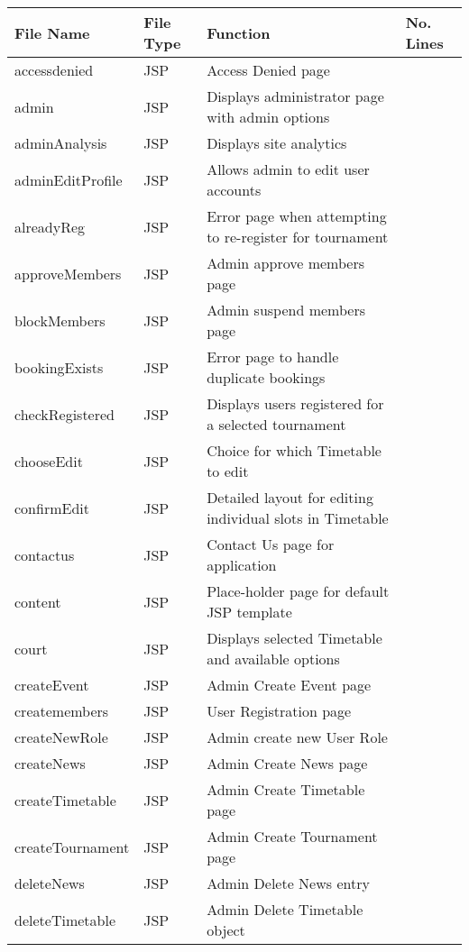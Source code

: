 \begin{table}[H]
\begin{center}
     \begin{tabular}{| l | l | l| p{1cm} |}
    \hline
    File Name & File Type & Function & No. Lines\\ \hline
	accessdenied & JSP & Access Denied page\\ \hline	
	admin & JSP & Displays administrator page with admin options\\ \hline	
	adminAnalysis & JSP & Displays site analytics\\ \hline	
	adminEditProfile & JSP & Allows admin to edit user accounts\\ \hline	
	alreadyReg & JSP & Error page when attempting to re-register for tournament \\ \hline	
	approveMembers & JSP & Admin approve members page\\ \hline	
	blockMembers & JSP & Admin suspend members page\\ \hline	
	bookingExists & JSP & Error page to handle duplicate bookings\\ \hline	
	checkRegistered & JSP & Displays users registered for a selected tournament\\ \hline	
	chooseEdit & JSP & Choice for which Timetable to edit\\ \hline	
	confirmEdit & JSP & Detailed layout for editing individual slots in Timetable\\ \hline	
	contactus & JSP & Contact Us page for application\\ \hline	
	content & JSP & Place-holder page for default JSP template\\ \hline	
	court & JSP & Displays selected Timetable and available options\\ \hline	
	createEvent & JSP & Admin Create Event page\\ \hline	
	createmembers & JSP & User Registration page\\ \hline	
	createNewRole & JSP & Admin create new User Role\\ \hline	
	createNews & JSP & Admin Create News page\\ \hline	
	createTimetable & JSP & Admin Create Timetable page\\ \hline	
	createTournament & JSP & Admin Create Tournament page\\ \hline	
	deleteNews & JSP & Admin Delete News entry\\ \hline	
	deleteTimetable & JSP & Admin Delete Timetable object\\ \hline	

\end{tabular}
\end{center}
\end{table}

